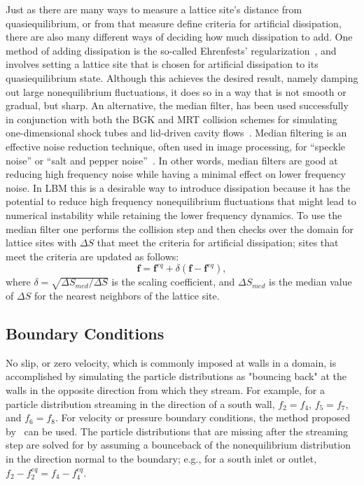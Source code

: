 \documentclass[pdftex,ms]{pittetd}
\begin{document}
Just as there are many ways to measure a lattice site's distance from quasiequilibrium, or from that measure define criteria for artificial dissipation, there are also many different ways of deciding how much dissipation to add.
One method of adding dissipation is the so-called Ehrenfests' regularization~\cite{brownlee2006stabilization}, and involves setting a lattice site that is chosen for artificial dissipation to its quasiequilibrium state.
Although this achieves the desired result, namely damping out large nonequilibrium fluctuations, it does so in a way that is not smooth or gradual, but sharp.
An alternative, the median filter, has been used successfully in conjunction with both the BGK and MRT collision schemes for simulating one-dimensional shock tubes and lid-driven cavity flows~\cite{brownlee2008nonequilibrium,gorban2014enhancement,packwood2009entropy}.
Median filtering is an effective noise reduction technique, often used in image processing, for ``speckle noise'' or ``salt and pepper noise''~\cite{brownlee2008nonequilibrium}.
In other words, median filters are good at reducing high frequency noise while having a minimal effect on lower frequency noise.
In LBM this is a desirable way to introduce dissipation because it has the potential to reduce high frequency nonequilibrium fluctuations that might lead to numerical instability while retaining the lower frequency dynamics.
To use the median filter one performs the collision step and then checks over the domain for lattice sites with $\Delta S$ that meet the criteria for artificial dissipation; sites that meet the criteria are updated as follows:
\begin{equation} \label{eq:median-filter}
\mathbf{f} = \mathbf{f}^{eq} + \delta (\mathbf{f} - \mathbf{f}^{eq}),
\end{equation}
\noindent where $\delta = \sqrt{\Delta S_{med} / \Delta S}$ is the scaling coefficient, and $\Delta S_{med}$ is the median value of $\Delta S$ for the nearest neighbors of the lattice site.


\subsection{Boundary Conditions}

No slip, or zero velocity, which is commonly imposed at walls in a domain, is accomplished by simulating the particle distributions as "bouncing back" at the walls in the opposite direction from which they stream.
For example, for a particle distribution streaming in the direction of a south wall, $f_2 = f_4$, $f_5 = f_7$, and $f_6 = f_8$.
For velocity or pressure boundary conditions, the method proposed by~\citet{zou1997pressure} can be used.
The particle distributions that are missing after the streaming step are solved for by assuming a bounceback of the nonequilibrium distribution in the direction normal to the boundary; e.g., for a south inlet or outlet, $f_2 - f_2^{eq} = f_4 - f_4^{eq}$.
\end{document}
